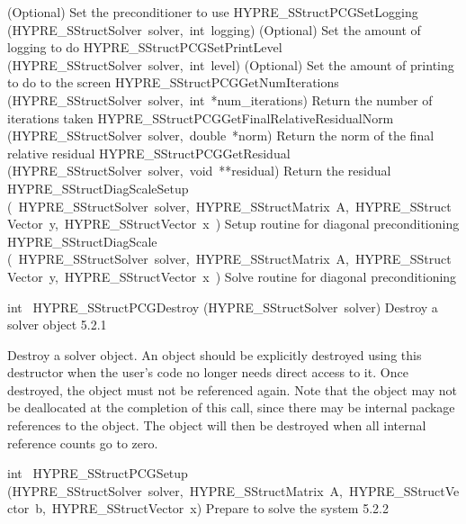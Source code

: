 \documentclass{article}
\begin{document}
\begin{cxxentry}
\begin{cxxentry}
\begin{cxxnames}
        {
(Optional) Set the preconditioner to use}
        {}
\label{cxx.5.2.10}
        {HYPRE\_SStructPCGSetLogging}
        {(HYPRE\_SStructSolver\ solver,\ int\ logging)}
        {
(Optional) Set the amount of logging to do}
        {}
\label{cxx.5.2.11}
        {HYPRE\_SStructPCGSetPrintLevel}
        {(HYPRE\_SStructSolver\ solver,\ int\ level)}
        {
(Optional) Set the amount of printing to do to the screen}
        {}
\label{cxx.5.2.12}
        {HYPRE\_SStructPCGGetNumIterations}
        {(HYPRE\_SStructSolver\ solver,\ int\ *num\_iterations)}
        {
Return the number of iterations taken}
        {}
\label{cxx.5.2.13}
        {HYPRE\_SStructPCGGetFinalRelativeResidualNorm}
        {(HYPRE\_SStructSolver\ solver,\ double\ *norm)}
        {
Return the norm of the final relative residual}
        {}
\label{cxx.5.2.14}
        {HYPRE\_SStructPCGGetResidual}
        {(HYPRE\_SStructSolver\ solver,\ void\ **residual)}
        {
Return the residual}
        {}
\label{cxx.5.2.15}
        {HYPRE\_SStructDiagScaleSetup}
        {(\ HYPRE\_SStructSolver\ solver,\ HYPRE\_SStructMatrix\ A,\ HYPRE\_SStructVector\ y,\ HYPRE\_SStructVector\ x\ )}
        {
Setup routine for diagonal preconditioning}
        {}
\label{cxx.5.2.16}
        {HYPRE\_SStructDiagScale}
        {(\ HYPRE\_SStructSolver\ solver,\ HYPRE\_SStructMatrix\ A,\ HYPRE\_SStructVector\ y,\ HYPRE\_SStructVector\ x\ )}
        {
Solve routine for diagonal preconditioning}
        {}
\label{cxx.5.2.17}
\end{cxxnames}
\begin{cxxfunction}
{int\ }
        {HYPRE\_SStructPCGDestroy}
        {(HYPRE\_SStructSolver\ solver)}
        {
Destroy a solver object}
        {5.2.1}
\begin{cxxdoc}

Destroy a solver object.  An object should be explicitly destroyed
using this destructor when the user's code no longer needs direct
access to it.  Once destroyed, the object must not be referenced
again.  Note that the object may not be deallocated at the
completion of this call, since there may be internal package
references to the object.  The object will then be destroyed when
all internal reference counts go to zero.
\end{cxxdoc}
\end{cxxfunction}
\begin{cxxfunction}
{int\ }
        {HYPRE\_SStructPCGSetup}
        {(HYPRE\_SStructSolver\ solver,\ HYPRE\_SStructMatrix\ A,\ HYPRE\_SStructVector\ b,\ HYPRE\_SStructVector\ x)}
        {
Prepare to solve the system}
        {5.2.2}
\begin{cxxdoc}


\end{cxxdoc}
\end{cxxfunction}
\end{cxxentry}
\end{cxxentry}
\end{document}
